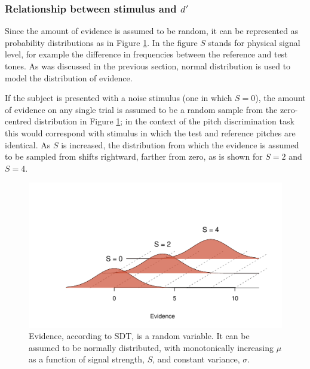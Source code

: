 \documentclass{article}\usepackage{knitr}
\begin{document}
\subsubsection{Relationship between stimulus and $d'$}

Since the amount of evidence is assumed to be random, it can be represented as probability distributions as in Figure \ref{fig:SDT}. In the figure $S$ stands for physical signal level, for example the difference in frequencies between the reference and test tones. As was discussed in the previous section, normal distribution is used to model the distribution of evidence. 

If the subject is presented with a noise stimulus (one in which $S = 0$), the amount of evidence on any single trial is assumed to be a random sample from the zero-centred distribution in Figure \ref{fig:SDT}; in the context of the pitch discrimination task this would correspond with stimulus in which the test and reference pitches are identical. As $S$ is increased, the distribution from which the evidence is assumed to be sampled from shifts rightward, farther from zero, as is shown for $S = 2$ and $S = 4$.

\begin{figure}[!htb]
\begin{center}
\begin{knitrout}
\color{fgcolor}
\includegraphics[width=\maxwidth]{figure/unnamed-chunk-2-1} 

\end{knitrout}
\end{center}
\caption{Evidence, according to SDT, is a random  variable. It can be assumed to be normally distributed, with monotonically increasing $\mu$ as a function of signal strength, $S$, and constant variance, $\sigma$.}
\label{fig:SDT}
\end{figure}
\end{document}
